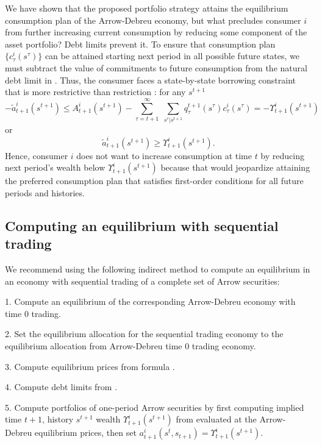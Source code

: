 We have shown that the proposed portfolio strategy attains the equilibrium
consumption plan
 of the Arrow-Debreu economy, but what
precludes consumer $i$ from further increasing current consumption by
reducing some component of the asset portfolio? Debt limits prevent it.  
 To ensure that consumption plan
$\{c^i_\tau(s^\tau)\}$
can be attained starting next period in all possible future states,
we must subtract the value of commitments to future
consumption
from the natural debt limit in .
 Thus, the consumer faces a
state-by-state borrowing constraint that is more
 restrictive than restriction :
for any $s^{t+1}$
$$  -  \tilde a^i_{t+1}(s^{t+1}) \leq  A^i_{t+1}(s^{t+1} )
- \sum_{\tau=t+1}^\infty \; \sum_{s^\tau \vert s^{t+1}}
  q_\tau^{t+1}(s^\tau) c^i_\tau(s^\tau)
  = - \Upsilon^i_{t+1}(s^{t+1})$$
or
$$   \tilde a^i_{t+1}(s^{t+1})  \geq  \Upsilon^i_{t+1}(s^{t+1}). $$
Hence, consumer $i$ does not want to increase consumption at time $t$ by
reducing next period's wealth below $\Upsilon^i_{t+1}(s^{t+1})$ because
that would jeopardize attaining the preferred consumption plan
that satisfies first-order conditions  for all future periods and
histories.


\subsection{Computing an equilibrium with sequential
            trading}\label{sec:example4cont}%
We  recommend using the following indirect method to compute 
an 
equilibrium in an economy with sequential trading of a complete set of Arrow securities:

\medskip
\item {1.}  Compute an equilibrium of the corresponding  Arrow-Debreu economy with time $0$ trading.
\medskip
\item {2.} Set the equilibrium allocation for the sequential trading economy to  the equilibrium allocation from Arrow-Debreu
time $0$ trading economy.
\medskip
\item {3.} Compute equilibrium prices from formula .
\medskip
\item{4.} Compute debt limits from .
\medskip
\item {5.}  Compute portfolios of one-period Arrow securities  by first computing implied time $t+1$, history $s^{t+1}$
wealth $\Upsilon^i_{t+1}(s^{t+1}) $ from  evaluated at the Arrow-Debreu equilibrium prices,
then set $a^i_{t+1}(s^t,s_{t+1}) 
          = \Upsilon^i_{t+1}(s^{t+1})$.

